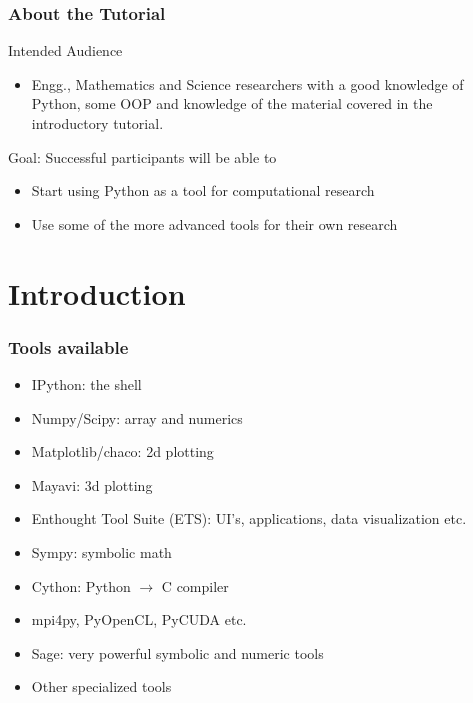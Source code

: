 \documentclass[14pt,compress]{beamer}
\begin{document}
\begin{frame}
  \frametitle{About the Tutorial}
  \begin{block}{Intended Audience}
  \begin{itemize}
       \item Engg., Mathematics and Science researchers with a
           good knowledge of Python, some OOP and knowledge of the material
           covered in the introductory tutorial.
  \end{itemize}
  \end{block}  

  \begin{block}{Goal: Successful participants will be able to}
    \begin{itemize}
      \item Start using Python as a tool for computational research

      \item Use some of the more advanced tools for their own research

    \end{itemize}
  \end{block}
\end{frame}

\section{Introduction}

\begin{frame}
    \frametitle{Tools available}
    \begin{itemize}
        \item IPython: the shell
        \item Numpy/Scipy: array and numerics
        \item Matplotlib/chaco: 2d plotting
        \item Mayavi: 3d plotting
        \item Enthought Tool Suite (ETS): UI's, applications, data
            visualization etc.
        \item Sympy: symbolic math 
        \item Cython: Python $\rightarrow$ C compiler 
        \item mpi4py, PyOpenCL, PyCUDA etc. 
            
            \vspace*{0.2in}
        \item Sage: very powerful symbolic and numeric tools
        \item Other specialized tools 

    \end{itemize}
\end{frame}
\end{document}
